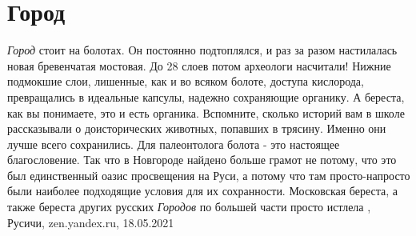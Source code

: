  
 
 
 
 
\chapter{Город}

\emph{Город} стоит на болотах. Он постоянно подтоплялся, и раз за разом настилалась
новая бревенчатая мостовая. До 28 слоев потом археологи насчитали! Нижние
подмокшие слои, лишенные, как и во всяком болоте, доступа кислорода,
превращались в идеальные капсулы, надежно сохраняющие органику. А береста, как
вы понимаете, это и есть органика.  Вспомните, сколько историй вам в школе
рассказывали о доисторических животных, попавших в трясину. Именно они лучше
всего сохранились. Для палеонтолога болота - это настоящее благословение.  Так
что в Новгороде найдено больше грамот не потому, что это был единственный оазис
просвещения на Руси, а потому что там просто-напросто были наиболее подходящие
условия для их сохранности. Московская береста, а также береста других русских
\emph{Городов} по большей части просто истлела
, 
Русичи, zen.yandex.ru, 18.05.2021


